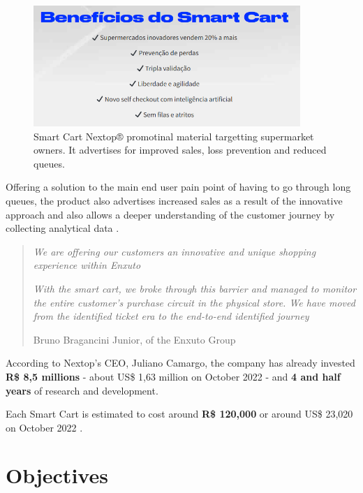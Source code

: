 \documentclass[openright]{normas-utf-tex} %
\begin{document}
\begin{figure}[H]
	\centering
	\includegraphics[width=0.9\textwidth]{./images/nextoppromo.png}
    \caption[Smart Cart Nextop® promotional material targetting supermarket owners]{Smart Cart Nextop® promotinal material targetting supermarket owners. It advertises for improved sales, loss prevention and reduced queues.}
	\label{fig:nextopui}
\end{figure}

Offering a solution to the main end user pain point of having to go through
long queues, the product also advertises increased sales as a result of the
innovative approach and also allows a deeper understanding of the customer
journey by collecting analytical data \cite{Paraiba2022}.

\begin{quote}
\textit{We are offering our customers an innovative and unique shopping experience within Enxuto}

\textit{With the smart cart, we broke through this barrier and managed to monitor the
entire customer's purchase circuit in the physical store. We have moved
from the identified ticket era to the end-to-end identified journey}

    Bruno Bragancini Junior,  of the Enxuto Group \cite{Paraiba2022}
\end{quote}

According to Nextop's CEO, Juliano Camargo, the company has already invested \textbf{R\$ 8,5 millions} - about US\$ 1,63 million on October 2022 - and \textbf{4 and half years}
of research and development.

Each Smart Cart is estimated to cost around \textbf{R\$ 120,000} or around US\$ 23,020 on October 2022 \cite{Paraiba2022}.

\section{Objectives}
\end{document}
